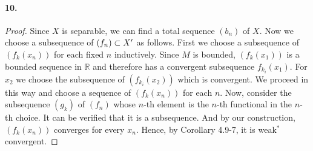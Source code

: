   \paragraph{10.}
  \begin{proof}
    Since $X$ is separable, we can find a total sequence $(b_n)$ of $X$. Now we
    choose a subsequence of $(f_n)\subset X^\prime$ as follows. First we choose a 
    subsequence of $(f_k(x_n))$ for each fixed $n$ inductively. Since $M$ is
    bounded, $(f_k(x_1))$ is a bounded sequence in $\mathbb{R}$ and therefore
    has a convergent subsequence $f_{k_i}(x_1)$. For $x_2$ we choose the 
    subsequence of $(f_{k_i}(x_2))$ which is convergent. We proceed in this way
    and choose a sequence of $(f_k(x_n))$ for each $n$. Now, consider the
    subsequence $(g_k)$ of $(f_n)$ whose $n$-th element is the $n$-th functional 
    in the $n$-th choice. It can be verified that it is a subsequence. And by
    our construction, $(f_k(x_n))$ converges for every $x_n$. Hence, by 
    Corollary 4.9-7, it is weak$^*$ convergent.
  \end{proof}



















